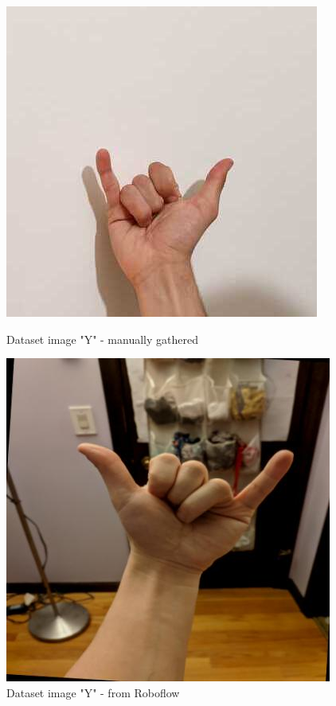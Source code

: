 \documentclass[10pt]{article}
\begin{document}
	\begin{figure}[H]
		\centering
		\begin{minipage}[b]{0.45\textwidth}
			\includegraphics[width=\textwidth]{imgs/Y-m2}
			\caption{Dataset image "Y" - manually gathered}
		\end{minipage}
		\hfill
		\begin{minipage}[b]{0.45\textwidth}
			\includegraphics[width=\textwidth]{imgs/training2}
			\caption{Dataset image "Y" - from Roboflow\cite{4}}
		\end{minipage}
	\end{figure}
\end{document}
